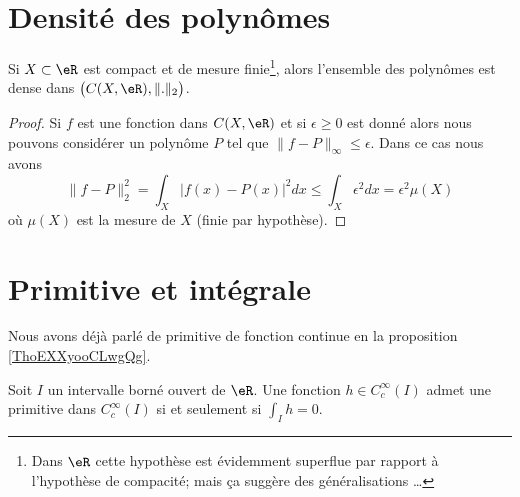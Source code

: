 


\section{Densité des polynômes}

\begin{corollary}   \label{CorRSczQD}
	Si \( X\subset \eR\) est compact et de mesure finie\footnote{Dans \( \eR\) cette hypothèse est évidemment superflue par rapport à l'hypothèse de compacité; mais ça suggère des généralisations \ldots}, alors l'ensemble des polynômes est dense dans \( \big( C(X,\eR),\| . \|_2 \big)\).
\end{corollary}

\begin{proof}
	Si \( f\) est une fonction dans \( C(X,\eR)\) et si \( \epsilon\geq 0\) est donné alors nous pouvons considérer un polynôme \( P\) tel que \( \| f-P \|_{\infty}\leq \epsilon\). Dans ce cas nous avons
	\begin{equation}
		\| f-P \|_2^2=\int_X| f(x)-P(x) |^2dx\leq \int_X\epsilon^2dx=\epsilon^2\mu(X)
	\end{equation}
	où \( \mu(X)\) est la mesure de \( X\) (finie par hypothèse).
\end{proof}

\section{Primitive et intégrale}

Nous avons déjà parlé de primitive de fonction continue en la proposition \ref{ThoEXXyooCLwgQg}.

\begin{proposition} \label{PropHFWNpRb}
	Soit \( I \) un intervalle borné ouvert de \( \eR\). Une fonction \( h\in C^{\infty}_c(I)\) admet une primitive dans \(  C^{\infty}_c(I)\) si et seulement si \( \int_Ih=0\).
\end{proposition}

